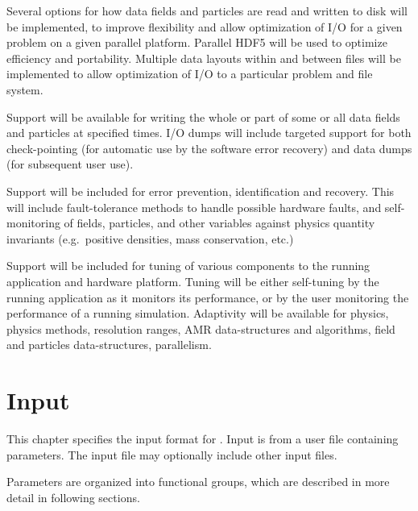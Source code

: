 \documentclass{book}
\begin{document}

   Several options for how data fields and particles are read and
   written to disk will be implemented, to improve flexibility and
   allow optimization of I/O for a given problem on a given parallel
   platform.  Parallel HDF5 will be used to optimize efficiency and
   portability.  Multiple data layouts within and between files will
   be implemented to allow optimization of I/O to a particular problem
   and file system.


   Support will be available for writing the whole or part of some or
   all data fields and particles at specified times.  I/O dumps will
   include targeted support for both check-pointing (for automatic use
   by the software error recovery) and data dumps (for subsequent user
   use).  
   

   Support will be included for error prevention, identification and
   recovery.  This will include fault-tolerance methods to handle
   possible hardware faults, and self-monitoring of fields, particles,
   and other variables against physics quantity invariants
   (e.g.~positive densities, mass conservation, etc.)


   Support will be included for tuning of various components to the
   running application and hardware platform.  Tuning will be either
   self-tuning by the running application as it monitors its
   performance, or by the user monitoring the performance of a running
   simulation.  Adaptivity will be available for physics, physics
   methods, resolution ranges, AMR data-structures and algorithms,
   field and particles data-structures, parallelism.

\chapter{Input} \label{s:inputs}

   This chapter specifies the input format for \cello.  Input is from
   a user file containing parameters.  The input file may optionally
   include other input files.

   Parameters are organized into functional groups, which are described
   in more detail in following sections.
\end{document}
